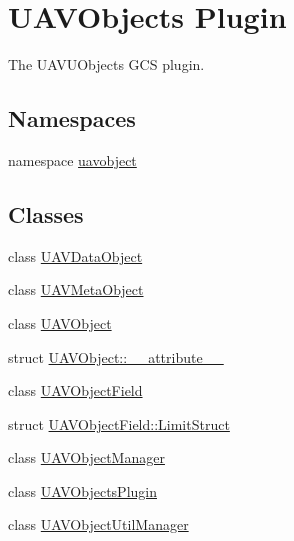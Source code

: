 \hypertarget{group___u_a_v_objects_plugin}{\section{U\-A\-V\-Objects Plugin}
\label{group___u_a_v_objects_plugin}
}


The U\-A\-V\-U\-Objects G\-C\-S plugin.  


\subsection*{Namespaces}
\begin{DoxyCompactItemize}
\item 
namespace \hyperlink{namespaceuavobject}{uavobject}
\end{DoxyCompactItemize}
\subsection*{Classes}
\begin{DoxyCompactItemize}
\item 
class \hyperlink{class_u_a_v_data_object}{U\-A\-V\-Data\-Object}
\item 
class \hyperlink{class_u_a_v_meta_object}{U\-A\-V\-Meta\-Object}
\item 
class \hyperlink{class_u_a_v_object}{U\-A\-V\-Object}
\item 
struct \hyperlink{struct_u_a_v_object_1_1____attribute____}{U\-A\-V\-Object\-::\-\_\-\-\_\-attribute\-\_\-\-\_\-}
\item 
class \hyperlink{class_u_a_v_object_field}{U\-A\-V\-Object\-Field}
\item 
struct \hyperlink{struct_u_a_v_object_field_1_1_limit_struct}{U\-A\-V\-Object\-Field\-::\-Limit\-Struct}
\item 
class \hyperlink{class_u_a_v_object_manager}{U\-A\-V\-Object\-Manager}
\item 
class \hyperlink{class_u_a_v_objects_plugin}{U\-A\-V\-Objects\-Plugin}
\item 
class \hyperlink{class_u_a_v_object_util_manager}{U\-A\-V\-Object\-Util\-Manager}
\end{DoxyCompactItemize}
